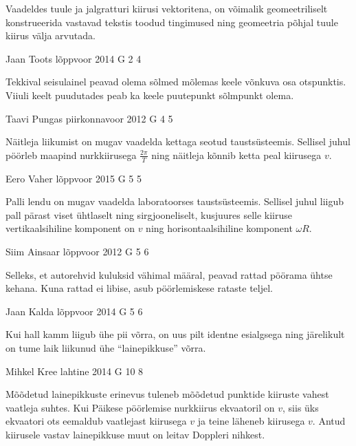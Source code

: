 \documentclass[11pt, twoside]{article}
\begin{document}
{{\ifHint
Vaadeldes tuule ja jalgratturi kiirusi vektoritena, on võimalik geomeetriliselt konstrueerida vastavad tekstis toodud tingimused ning geomeetria põhjal tuule kiirus välja arvutada.
\fi
}

{Jaan Toots} %
{lõppvoor} %
{2014} %
{G 2} %
{4} %
{

\ifHint
Tekkival seisulainel peavad olema sõlmed mõlemas keele võnkuva osa otspunktis. Viiuli keelt puudutades peab ka keele puutepunkt sõlmpunkt olema.
\fi
}

{Taavi Pungas} %
{piirkonnavoor} %
{2012} %
{G 4} %
{5} %
{

\ifHint
Näitleja liikumist on mugav vaadelda kettaga seotud taustsüsteemis. Sellisel juhul pöörleb maapind nurkkiirusega $\frac{2\pi}{T}$ ning näitleja kõnnib ketta peal kiirusega $v$.
\fi
}

{Eero Vaher} %
{lõppvoor} %
{2015} %
{G 5} %
{5} %
{

\ifHint
Palli lendu on mugav vaadelda laboratoorses taustsüsteemis. Sellisel juhul liigub pall pärast viset ühtlaselt ning sirgjooneliselt, kusjuures selle kiiruse vertikaalsihiline komponent on $v$ ning horisontaalsihiline komponent $\omega R$.
\fi
}

{Siim Ainsaar} %
{lõppvoor} %
{2012} %
{G 5} %
{6} %
{

\ifHint
Selleks, et autorehvid kuluksid vähimal määral, peavad rattad pöörama ühtse kehana. Kuna rattad ei libise, asub pöörlemiskese rataste teljel.
\fi
}

{Jaan Kalda} %
{lõppvoor} %
{2014} %
{G 5} %
{6} %
{

\ifHint
Kui hall kamm liigub ühe pii võrra, on uus pilt identne esialgsega ning järelikult on tume laik liikunud ühe \enquote{lainepikkuse} võrra.
\fi
}

{Mihkel Kree} %
{lahtine} %
{2014} %
{G 10} %
{8} %
{

\ifHint
Mõõdetud lainepikkuste erinevus tuleneb mõõdetud punktide kiiruste vahest vaatleja suhtes. Kui Päikese pöörlemise nurkkiirus ekvaatoril on $v$, siis üks ekvaatori ots eemaldub vaatlejast kiirusega $v$ ja teine läheneb kiirusega $v$. Antud kiirusele vastav lainepikkuse muut on leitav Doppleri nihkest.
\fi
}

}
\end{document}
